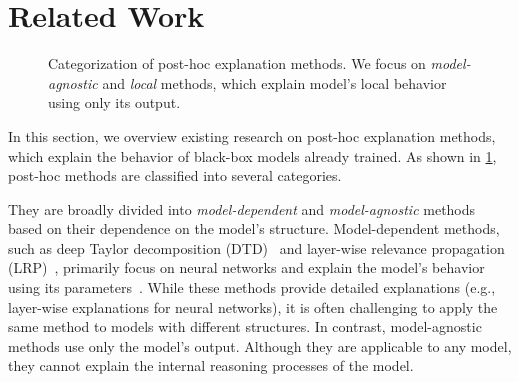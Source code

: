\documentclass[runningheads]{llncs}
\begin{document}
{\section{Related Work}\label{sec:related-work}
\begin{figure}[tbp]
  \centering
  \def\w{2.5}
  \def\ww{5.0}
  \def\h{0.5}
  \def\hh{1.3}
  \def\hhh{1.8}
  \def\hhhh{2.6}
  \caption{%
    Categorization of post-hoc explanation methods.
    We focus on \emph{model-agnostic} and \emph{local} methods,
    which explain model's local behavior using only its output.
  }\label{fig:post-hoc}
\end{figure}
In this section,
we overview existing research on post-hoc explanation methods,
which explain the behavior of black-box models already trained.
As shown in \cref{fig:post-hoc},
post-hoc methods are classified into several categories.

They are broadly divided into
\emph{model-dependent} and \emph{model-agnostic} methods
based on their dependence on the model's structure.
Model-dependent methods,
such as deep Taylor decomposition (DTD)~\cite{montavon2017explaining}
and layer-wise relevance propagation (LRP)~\cite{bach2015pixel},
primarily focus on neural networks and
explain the model's behavior using its parameters~\cite{samek2021explaining}.
While these methods provide detailed explanations
(e.g., layer-wise explanations for neural networks),
it is often challenging
to apply the same method to models with different structures.
In contrast,
model-agnostic methods use only the model's output.
Although they are applicable to any model,
they cannot explain the internal reasoning processes of the model.

}
\end{document}

